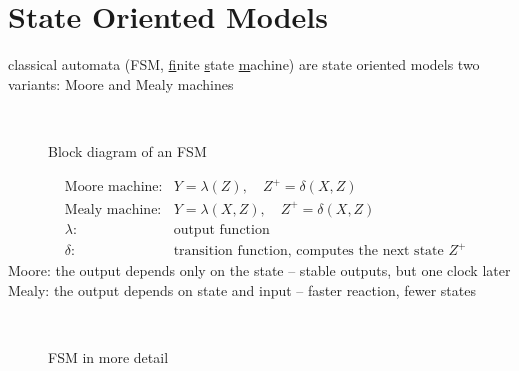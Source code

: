 \section{State Oriented Models}

\bi
	\ite classical automata (FSM, \underline{f}inite \underline{s}tate \underline{m}achine) are state oriented models
	\ite two variants: Moore and Mealy machines
\ei

\begin{figure}[!hbtp]
     \begin{center}
	  \\
	  \caption{Block diagram of an FSM}
     \end{center}
\end{figure}

\os{\newpage}

\begin{eqnarray*}
&\textrm{Moore machine:} & Y = \lambda (Z), \quad Z^{+} = \delta(X,Z)\\
&\textrm{Mealy machine:} & Y = \lambda(X,Z), \quad Z^{+} = \delta(X,Z)\\[2ex]
&\lambda: & \textrm{output function}\\
&\delta: & \textrm{transition function, computes the next state } Z^{+}
\end{eqnarray*}
\bi
	\ite Moore: the output depends only on the state -- stable outputs, but one clock later
	\ite Mealy: the output depends on state and input -- faster reaction, fewer states
\ei
\os{\newpage}

\begin{figure}[!hbtp]
     \begin{center}
	  \\
	  \caption{FSM in more detail}
     \end{center}
\end{figure}

